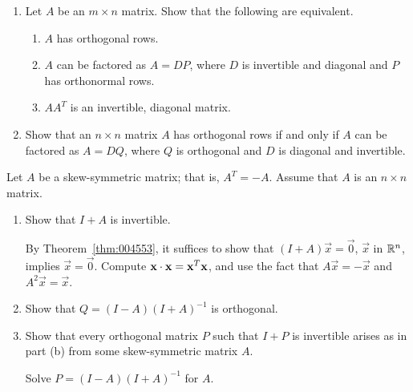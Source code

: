 \documentclass{ximera}
\begin{document}
\begin{problem}\label{prob:ortho23}
\begin{enumerate} 
\item Let $A$ be an $m \times n$ matrix. Show that the following are equivalent.


\begin{enumerate}[label={\roman*.}]
\item $A$ has orthogonal rows.

\item $A$ can be factored as $A = DP$, where $D$ is invertible and diagonal and $P$ has orthonormal rows.

\item $AA^{T}$ is an invertible, diagonal matrix.

\end{enumerate}
\item Show that an $n \times n$ matrix $A$ has orthogonal rows if and only if $A$ can be factored as $A = DQ$, where $Q$ is orthogonal and $D$ is diagonal and invertible.

\end{enumerate}
\end{problem}

\begin{problem}\label{prob:ortho24}
Let $A$ be a skew-symmetric matrix; that is, $A^{T} = -A$. Assume that $A$ is an $n \times n$ matrix.


\begin{enumerate} 
\item Show that $I + A$ is invertible. 
\begin{hint}
By Theorem~\ref{thm:004553}, it suffices to show that $(I + A)\vec{x} = \vec{0}$, $\vec{x}$ in $\mathbb{R}^n$, implies $\vec{x} = \vec{0}$. Compute $\mathbf{x} \cdot \mathbf{x} = \mathbf{x}^{T}\mathbf{x}$, and use the fact that $A\vec{x} = -\vec{x}$ and $A^{2}\vec{x} = \vec{x}$.
\end{hint}

\item Show that $Q = (I - A)(I + A)^{-1}$ is orthogonal.

\item Show that every orthogonal matrix $P$ such that $I + P$ is invertible arises as in part (b) from some skew-symmetric matrix $A$. 
\begin{hint}
Solve $P = (I - A)(I + A)^{-1}$ for $A$.
\end{hint}

\end{enumerate}

\end{problem}
\end{document}
